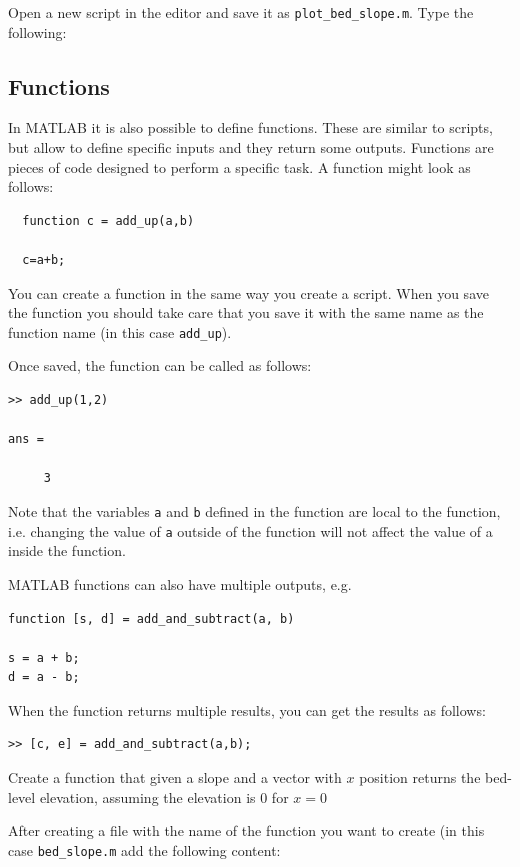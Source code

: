 \documentclass[a4paper]{article}
\begin{document}
\begin{solution}
  Open a new script in the editor and save it as \lstinline!plot_bed_slope.m!. Type the following:
  
\end{solution}


\subsection{Functions}
In MATLAB it is also possible to define functions. These are similar to scripts, but allow to define specific inputs and they return some outputs. Functions are pieces of code designed to perform a specific task. A function might look as follows:
\begin{lstlisting}
  function c = add_up(a,b)

  c=a+b;
\end{lstlisting}
You can create a function in the same way you create a script. When you save the function you should take care that you save it with the same name as the function name (in this case \lstinline=add_up=).

Once saved, the function can be called as follows:
\begin{lstlisting}
>> add_up(1,2)

ans =

     3

\end{lstlisting}
Note that the variables \lstinline=a= and \lstinline=b= defined in the function are local to the function, i.e. changing the value of \lstinline=a= outside of the function will not affect the value of a inside the function.

MATLAB functions can also have multiple outputs, e.g.
\begin{lstlisting}
function [s, d] = add_and_subtract(a, b)

s = a + b;
d = a - b;
\end{lstlisting}
When the function returns multiple results, you can get the results as follows:
\begin{lstlisting}
>> [c, e] = add_and_subtract(a,b);
\end{lstlisting}

\begin{exercise}
  Create a function that given a slope and a vector with $x$ position returns the bed-level elevation, assuming the elevation is 0 for $x=0$
\end{exercise}
\begin{solution}
After creating a file with the name of the function you want to create (in this case \lstinline=bed_slope.m= add the following content:

\end{solution}
\end{document}
